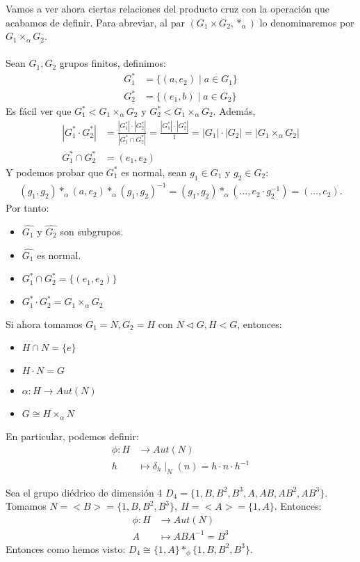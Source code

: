 Vamos a ver ahora ciertas relaciones del producto cruz con la operación que acabamos de definir. Para abreviar, al par $(G_1 \times G_2, \ast_\alpha)$ lo denominaremos por $G_1 \times_\alpha G_2$.\\\\
Sean $G_1, G_2$ grupos finitos, definimos:
\begin{align*}
	G_1^\ast &= \{(a, e_2) \mid a \in G_1\}\\
	G_2^\ast &= \{(e_1, b) \mid a \in G_2\}
\end{align*}
Es fácil ver que $G_1^\ast < G_1 \times_\alpha G_2$ y $G_2^\ast < G_1 \times_\alpha G_2$. Además,
\begin{align*}
	|G_1^\ast\cdot G_2^\ast| &= \frac{|G_1^\ast|\cdot |G_2^\ast|}{|G_1^\ast \cap G_2^\ast|} = \frac{|G_1^\ast|\cdot |G_2^\ast|}{1} = |G_1|\cdot |G_2| = |G_1 \times_\alpha G_2|\\
	G_1^\ast \cap G_2^\ast &= {(e_1, e_2)}
\end{align*}
Y podemos probar que $G_1^\ast$ es normal, sean $g_1 \in G_1$ y $g_2 \in G_2$:
\begin{align*}
	(g_1, g_2) \ast_\alpha (a, e_2) \ast_\alpha (g_1, g_2)^{-1} = (g_1,g_2)\ast_\alpha(\ldots, e_2\cdot g_2^{-1}) = (\ldots, e_2).
\end{align*}
Por tanto:
\begin{itemize}
	\item $\hat{G_1}$ y $\hat{G_2}$ son subgrupos.
	\item $\hat{G_1}$ es normal.
	\item $G_1^\ast \cap G_2^\ast = \{(e_1,e_2)\}$
	\item $G_1^\ast \cdot G_2^\ast = G_1 \times_\alpha G_2$
\end{itemize}
Si ahora tomamos $G_1 = N, G_2 = H$ con $N \triangleleft G, H < G$, entonces:
\begin{itemize}
	\item $H \cap N = \{e\}$
	\item $H \cdot N = G$
	\item $\alpha: H \longrightarrow Aut(N)$
	\item $G \cong H \times_\alpha N$
\end{itemize}
En particular, podemos definir:
\begin{align*}
	\phi : H &\longrightarrow Aut(N)\\
	h &\longmapsto \delta_h\mid_N(n) = h\cdot n\cdot h^{-1}
\end{align*}
\begin{ej}
	Sea el grupo diédrico de dimensión 4 $D_4 = \{1,B,B^2,B^3,A,AB,AB^2,AB^3\}$. Tomamos $N = <B> =\{1,B,B^2,B^3\},\ H=<A>=\{1,A\}$. Entonces:
	\begin{align*}
		\phi: H &\longrightarrow Aut(N)\\
		A &\longmapsto ABA^{-1} = B^3
	\end{align*}
Entonces como hemos visto: $D_4 \cong \{1,A\} \ast_\phi \{1,B,B^2,B^3\}$.
\end{ej}
